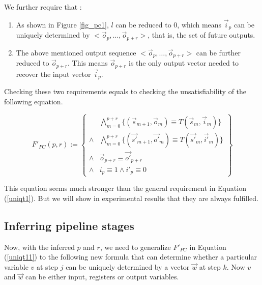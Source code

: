 \documentclass[runningheads,a4paper,orivec]{llncs}
\begin{document}
We further require that :
\begin{enumerate}
 \item As shown in Figure \ref{fig_pc1},
 $l$ can be reduced to 0,
 which means $\vec{i}_{p}$ can be uniquely determined by $<\vec{o}_{p},\dots,\vec{o}_{p+r}>$,
 that is,
 the set of future outputs.
 \item The above mentioned output sequence $<\vec{o}_{p},\dots,\vec{o}_{p+r}>$ 
 can be further reduced to $\vec{o}_{p+r}$.
 This means $\vec{o}_{p+r}$ is the only output vector needed to recover the input vector $\vec{i}_p$.
\end{enumerate}

Checking these two requirements
equals to checking the unsatisfiability of the following equation.

\begin{equation}\label{uniqt11}
F'_{PC}(p,r):=
\left\{
\begin{array}{cc}
&\bigwedge_{m=0}^{p+r}
\{
(\vec{s}_{m+1},\vec{o}_m)\equiv T(\vec{s}_m,\vec{i}_m)
\}
\\
\wedge&\bigwedge_{m=0}^{p+r}
\{
(\vec{s'}_{m+1},\vec{o'}_m)\equiv T(\vec{s'}_m,\vec{i'}_m)
\}
\\
\wedge&\vec{o}_{p+r}\equiv \vec{o'}_{p+r} \\
\wedge& i_{p}\equiv 1 \wedge  i'_{p}\equiv 0 
\end{array}
\right\}
\end{equation}


This equation seems much stronger than the general requirement in Equation (\ref{uniqt1}).
But we will show in experimental results that 
they are always fulfilled.



\subsection{Inferring pipeline stages}\label{subsec_inferstage}

Now,
with the inferred $p$ and $r$,
we need to generalize $F'_{PC}$ in Equation (\ref{uniqt11}) to the following new formula that
can determine whether a particular variable $v$ at step $j$
can be uniquely determined by a vector $\vec{w}$ at step $k$.
Now $v$ and $\vec{w}$ can be either input, registers or output variables.
\end{document}
